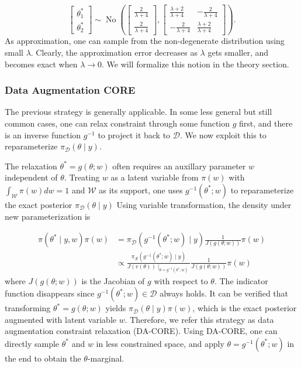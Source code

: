 \documentclass[10pt,fleqn]{article}
\newcommand{\be}{\begin{equation}\begin{aligned}}
\newcommand{\ee}{\end{aligned}\end{equation}}
\newcommand{\mc}[1]{\mathcal{#1}}
\DeclareMathOperator{\No}{No}
\DeclareMathOperator{\1}{\mathbbm{1}}
\begin{document}
$$\begin{bmatrix} \theta^*_1 \\ \theta^*_2 \end{bmatrix} \sim
\No \left(
\begin{bmatrix} \frac{2}{\lambda+4} \\ \frac{2}{\lambda+4} \end{bmatrix},
\begin{bmatrix} \frac{\lambda+2}{\lambda+4} & -\frac{2}{\lambda+4}  \\  -\frac{2}{\lambda+4}  &\frac{\lambda+2}{\lambda+4} \end{bmatrix}
\right).$$
As approximation, one can sample from the non-degenerate distribution using small $\lambda$. Clearly, the approximation error decreases as $\lambda$ gets
smaller, and becomes exact when $\lambda\rightarrow 0$. We will formalize
this notion in the theory section.

\subsubsection{Data Augmentation CORE}

The previous strategy is generally applicable. In some less general but
still common cases, one can relax constraint through some function
$g$ first, and there is an inverse function $g^{-1}$ to project it back to
$\mc D$. We now exploit this to reparameterize $\pi_{\mc D}(\theta\mid y)$.

The relaxation $\theta^*=g(\theta;w)$ often requires an auxillary parameter
$w$ independent of $\theta$. Treating $w$ as a latent variable from $\pi(w)$ with $\int_{\mc W} \pi(w) dw =1$ and $\mc W$ as
its support, one uses $g^{-1}(\theta^*;w)$ to reparameterize the exact posterior $\pi_{\mc D}(\theta\mid y)$
Using variable transformation, the density under new parameterization is


\be
\label{reparameterization}
\pi(\theta^*\mid y,w)\pi(w) & =\pi_{\mc D}(g^{-1}(\theta^*;w)\mid y) \frac{1}{J(g(\theta;w))}  \pi(w) \\
&\propto \frac{\pi_{\mc R}(g^{-1}(\theta^*;w)\mid y) }{ J(v(\theta))\mid_{\theta=g^{-1}(\theta^*;w)} } \frac{1}{J(g(\theta;w))} \pi(w) 
\ee
where   $J(g(\theta;w))$ is the Jacobian of $g$ with respect to $\theta$.
The indicator function disappears since $g^{-1}(\theta^*;w)\in \mc
D$ always holds. It can be verified that transforming $\theta^*=g(\theta;w)$  yields $\pi_{\mc D}(\theta\mid y) \pi(w)$, which is the exact posterior augmented
with latent variable $w$. Therefore, we refer this strategy as data augmentation
constraint relaxation (DA-CORE). Using DA-CORE, one can directly sample $\theta^*$ and $w$ in less constrained
space, and apply $\theta=g^{-1}(\theta^*;w)$ in the end to obtain the $\theta$-marginal.
\end{document}
